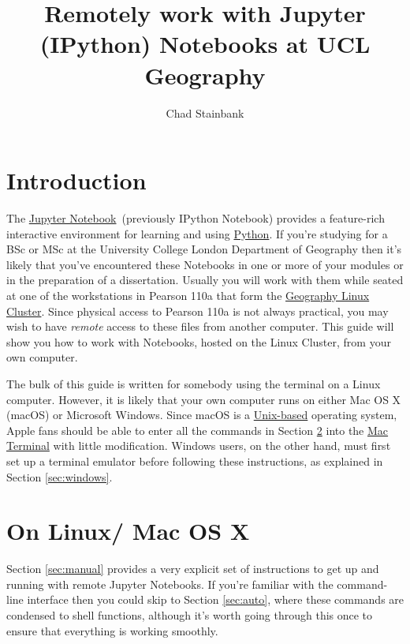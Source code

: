 \documentclass[a4paper]{article}
\title{Remotely work with Jupyter (IPython) Notebooks at UCL Geography}
\author{Chad Stainbank}
\begin{document}
\maketitle
\section{Introduction}
\label{sec:intro}
The \href{http://jupyter.org/}{Jupyter Notebook}~(previously IPython Notebook) provides a feature-rich interactive environment for learning and using \href{https://www.python.org/}{Python}.
If you're studying for a BSc or MSc at the University College London Department of Geography then it's likely that you've encountered these Notebooks in one or more of your modules or in the preparation of a dissertation.
Usually you will work with them while seated at one of the workstations in Pearson 110a that form the \href{http://www.geog.ucl.ac.uk/resources/computer-support/teaching-cluster}{Geography Linux Cluster}.
Since physical access to Pearson 110a is not always practical, you may wish to have \emph{remote} access to these files from another computer.
This guide will show you how to work with Notebooks, hosted on the Linux Cluster, from your own computer. 

The bulk of this guide is written for somebody using the terminal on a Linux computer.
However, it is likely that your own computer runs on either Mac OS X (macOS) or Microsoft Windows.
Since macOS is a \href{http://unix.stackexchange.com/questions/1489/is-mac-os-x-unix}{Unix-based} operating system, Apple fans should be able to enter all the commands in Section \ref{sec:linuxmac} into the \href{http://www.macworld.co.uk/feature/mac-software/get-more-out-of-os-x-terminal-3608274/}{Mac Terminal} with little modification.
Windows users, on the other hand, must first set up a terminal emulator before following these instructions, as explained in Section \ref{sec:windows}.



\section{On Linux/ Mac OS X}
\label{sec:linuxmac}
Section \ref{sec:manual} provides a very explicit set of instructions to get up and running with remote Jupyter Notebooks.
If you're familiar with the command-line interface then you could skip to Section \ref{sec:auto}, where these commands are condensed to shell functions, although it's worth going through this once to ensure that everything is working smoothly.
\end{document}

